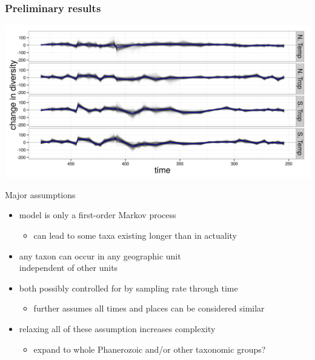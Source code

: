 \documentclass{beamer}
\begin{document}
\begin{frame}
  \frametitle{Preliminary results}
  \begin{center}
    \includegraphics[width=\textwidth,height=0.8\textheight,keepaspectratio=true]{figure/est_diff}
  \end{center}
\end{frame}

\begin{frame}
  \begin{block}{Major assumptions}
    \begin{itemize}
      \item model is only a first-order Markov process
        \begin{itemize}
          \item can lead to some taxa existing longer than in actuality
        \end{itemize}
      \item any taxon can occur in any geographic unit \\independent of other units
      \item both possibly controlled for by sampling rate through time
        \begin{itemize}
          \item further assumes all times and places can be considered similar
        \end{itemize}
      \item relaxing all of these assumption increases complexity
        \begin{itemize}
          \item expand to whole Phanerozoic and/or other taxonomic groups?
        \end{itemize}
    \end{itemize}
  \end{block}
\end{frame}
\end{document}
